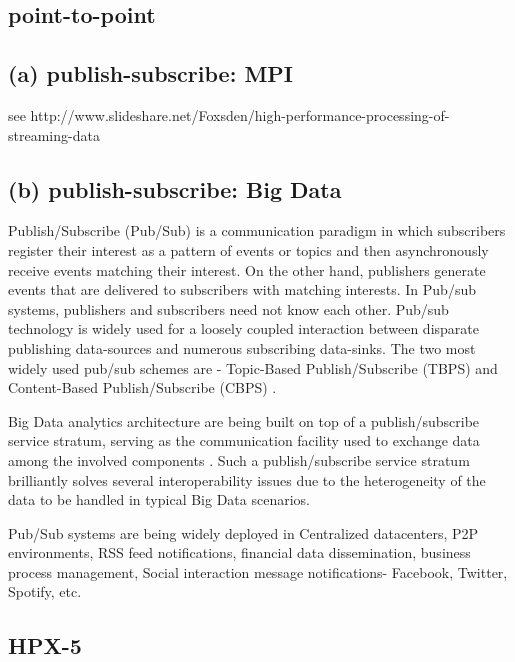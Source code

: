 \subsection{ point-to-point}
\subsection{ (a) publish-subscribe: MPI}

     see http://www.slideshare.net/Foxsden/high-performance-processing-of-streaming-data
     
\subsection{ (b) publish-subscribe: Big Data}

     Publish/Subscribe (Pub/Sub) \cite{thesis-pub-sub} is a
     communication paradigm in which subscribers register their
     interest as a pattern of events or topics and then asynchronously
     receive events matching their interest. On the other hand,
     publishers generate events that are delivered to subscribers with
     matching interests.  In Pub/sub systems, publishers and
     subscribers need not know each other. Pub/sub technology is
     widely used for a loosely coupled interaction between disparate
     publishing data-sources and numerous subscribing data-sinks. The
     two most widely used pub/sub schemes are - Topic-Based
     Publish/Subscribe (TBPS) and Content-Based Publish/Subscribe
     (CBPS) \cite{paper-pub-sub}.
      
     Big Data analytics architecture are being built on top of a
     publish/subscribe service stratum, serving as the communication
     facility used to exchange data among the involved components
     \cite{paper-pub-sub-bigdata}. Such a publish/subscribe service
     stratum brilliantly solves several interoperability issues due to
     the heterogeneity of the data to be handled in typical Big Data
     scenarios.

     Pub/Sub systems are being widely deployed in Centralized
     datacenters, P2P environments, RSS feed notifications, financial
     data dissemination, business process management, Social
     interaction message notifications- Facebook, Twitter, Spotify,
     etc.

\subsection{ HPX-5}

